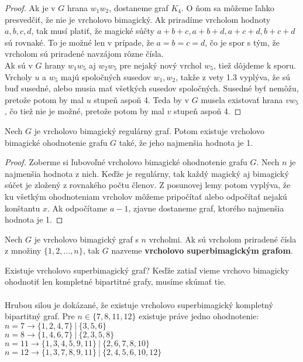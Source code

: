 \begin{proof}
Ak je v $G$ hrana $w_1 w_2$, dostaneme graf $K_4$. O ňom sa môžeme ľahko presvedčiť, že nie je vrcholovo bimagický. Ak priradíme vrcholom hodnoty $a,b,c,d$, tak musí platiť, že magické súčty $a+b+c, a+b+d, a+c+d, b+c+d$ sú rovnaké. To je možné len v prípade, že $a = b = c = d$, čo je spor s tým, že vrcholom sú priradené navzájom rôzne čísla. \\

Ak sú v $G$ hrany $w_1 w_5$ aj $w_2 w_5$ pre nejaký nový vrchol $w_5$, tiež dôjdeme k sporu. Vrcholy $u$ a $w_5$ majú spoločných susedov $w_1, w_2$, takže z vety 1.3 vyplýva, že sú buď susedné, alebo musia mať všetkých susedov spoločných. Susedné byť nemôžu, pretože potom by mal $u$ stupeň aspoň 4. Teda by v $G$ musela existovať hrana $v w_5$, čo tiež nie je možné, pretože potom by mal $v$ stupeň aspoň 4.
\end{proof}

\begin{subtheorem} Nech $G$ je vrcholovo bimagický regulárny graf. Potom existuje vrcholovo bimagické ohodnotenie grafu $G$ také, že jeho najmenšia hodnota je 1.
\end{subtheorem} 

\begin{proof} Zoberme si ľubovoľné vrcholovo bimagické ohodnotenie grafu $G$. Nech $n$ je najmenšia hodnota z nich. Keďže je regulárny, tak každý magický aj bimagický súčet je zložený z rovnakého počtu členov. Z posunovej lemy potom vyplýva, že ku všetkým ohodnoteniam vrcholov môžeme pripočítať alebo odpočítať nejakú konštantu $x$. Ak odpočítame $a-1$, zjavne dostaneme graf, ktorého najmenšia hodnota je 1.
\end{proof} 

\begin{subdefinition} Nech $G$ je vrcholovo bimagický graf s $n$ vrcholmi. Ak sú vrcholom priradené čísla z množiny $\{1, 2, ... , n\}$, tak $G$ nazveme \textbf{vrcholovo superbimagickým grafom}.
\end{subdefinition} 

Existuje vrcholovo superbimagický graf? Keďže zatiaľ vieme vrchovo bimagicky ohodnotiť len kompletné bipartitné grafy, musíme skúmať tie. \\\\

Hrubou silou je dokázané, že existuje vrcholovo superbimagický kompletný bipartitný graf. Pre $n \in \{7, 8, 11, 12\}$ existuje práve jedno ohodnotenie: \\
$n = 7 \rightarrow \{1, 2, 4, 7\} ~|~ \{3, 5, 6\}$ \\
$n = 8 \rightarrow \{1, 4, 6, 7\} ~|~ \{2, 3, 5, 8\}$ \\
$n = 11 \rightarrow \{1, 3, 4, 5, 9, 11\} ~|~ \{2, 6, 7, 8, 10\}$ \\
$n = 12 \rightarrow \{1, 3, 7, 8, 9, 11\} ~|~ \{2, 4, 5, 6, 10, 12\}$ \\\\

